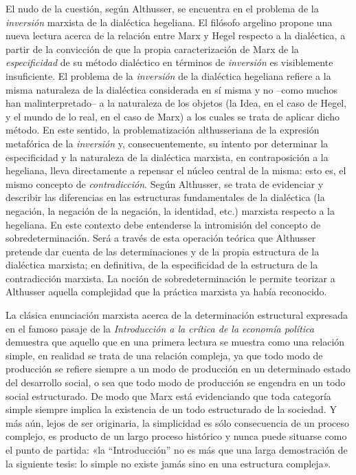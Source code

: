 El nudo de la cuestión, según Althusser, se encuentra en el problema de la \emph{inversión} marxista de la dialéctica hegeliana. El filósofo argelino propone una nueva lectura acerca de la relación entre Marx y Hegel respecto a la dialéctica, a partir de la convicción de que la propia caracterización de Marx de la \emph{especificidad} de su método dialéctico en términos de \emph{inversión} es visiblemente insuficiente. El problema de la \emph{inversión} de la dialéctica hegeliana refiere a la misma naturaleza de la dialéctica considerada en sí misma y no --como muchos han malinterpretado-- a la naturaleza de los objetos (la Idea, en el caso de Hegel, y el mundo de lo real, en el caso de Marx) a los cuales se trata de aplicar dicho método. En este sentido, la problematización althusseriana de la expresión metafórica de la \emph{inversión} y, consecuentemente, su intento por determinar la especificidad y la naturaleza de la dialéctica marxista, en contraposición a la hegeliana, lleva directamente a repensar el núcleo central de la misma: esto es, el mismo concepto de \emph{contradicción}. Según Althusser, se trata de evidenciar y describir las diferencias en las estructuras fundamentales de la dialéctica (la negación, la negación de la negación, la identidad, etc.) marxista respecto a la hegeliana. En este contexto debe entenderse la intromisión del concepto de sobredeterminación. Será a través de esta operación teórica que Althusser pretende dar cuenta de las determinaciones y de la propia estructura de la dialéctica marxista; en definitiva, de la especificidad de la estructura de la contradicción marxista. La noción de sobredeterminación le permite teorizar a Althusser aquella complejidad que la práctica marxista ya había reconocido.

La clásica enunciación marxista acerca de la determinación estructural expresada en el famoso pasaje de la \emph{Introducción a la crítica de la economía política }demuestra que aquello que en una primera lectura se muestra como una relación simple, en realidad se trata de una relación compleja, ya que todo modo de producción se refiere siempre a un modo de producción en un determinado estado del desarrollo social, o sea que todo modo de producción se engendra en un todo social estructurado. De modo que Marx está evidenciando que toda categoría simple siempre implica la existencia de un todo estructurado de la sociedad. Y más aún, lejos de ser originaria, la simplicidad es sólo consecuencia de un proceso complejo, es producto de un largo proceso histórico y nunca puede situarse como el punto de partida: «la ``Introducción'' no es más que una larga demostración de la siguiente tesis: lo simple no existe jamás sino en una estructura compleja».

